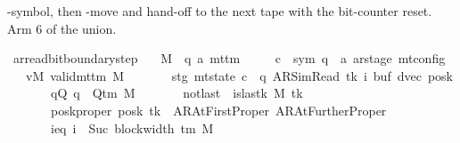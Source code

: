 \begin{isabellebody}
\begin{isamarkuptext}
  -symbol, then -move and hand-off to the next tape
   with the bit-counter reset.  Arm 6 of the union.%
\end{isamarkuptext}\isamarkuptrue%
\isamarkupfalse%
\ ar{\isacharunderscore}{\kern0pt}read{\isacharunderscore}{\kern0pt}bit{\isacharunderscore}{\kern0pt}boundary{\isacharunderscore}{\kern0pt}step{\isacharcolon}{\kern0pt}\isanewline
\ \ \ M\ {\isacharcolon}{\kern0pt}{\isacharcolon}{\kern0pt}\ {\isachardoublequoteopen}{\isacharparenleft}{\kern0pt}{\isacharprime}{\kern0pt}q{\isacharcomma}{\kern0pt}\ {\isacharprime}{\kern0pt}a{\isacharparenright}{\kern0pt}\ mttm{\isachardoublequoteclose}\isanewline
\ \ \ \ \ c{\isacharprime}{\kern0pt}\ {\isacharcolon}{\kern0pt}{\isacharcolon}{\kern0pt}\ {\isachardoublequoteopen}{\isacharparenleft}{\kern0pt}sym{}{\isacharcomma}{\kern0pt}\ {\isacharprime}{\kern0pt}q\ {\isasymtimes}\ {\isacharprime}{\kern0pt}a\ ar{\isacharunderscore}{\kern0pt}stage{\isacharparenright}{\kern0pt}\ mt{\isacharunderscore}{\kern0pt}config{\isachardoublequoteclose}\isanewline
\ \ \ vM{\isacharcolon}{\kern0pt}\ {\isachardoublequoteopen}valid{\isacharunderscore}{\kern0pt}mttm\ M{\isachardoublequoteclose}\isanewline
\ \ \ \ \ \ \ stg{\isacharcolon}{\kern0pt}\ {\isachardoublequoteopen}mt{\isacharunderscore}{\kern0pt}state\ c{\isacharprime}{\kern0pt}\ {\isacharequal}{\kern0pt}\ {\isacharparenleft}{\kern0pt}q{\isacharcomma}{\kern0pt}\ AR{\isacharunderscore}{\kern0pt}SimRead{\isacharcomma}{\kern0pt}\ tk{\isacharcomma}{\kern0pt}\ i{\isacharcomma}{\kern0pt}\ buf{\isacharcomma}{\kern0pt}\ dvec{\isacharcomma}{\kern0pt}\ posk{\isacharparenright}{\kern0pt}{\isachardoublequoteclose}\isanewline
\ \ \ \ \ \ \ qQ{\isacharcolon}{\kern0pt}\ {\isachardoublequoteopen}q\ {\isasymin}\ Q{\isacharunderscore}{\kern0pt}tm\ M{\isachardoublequoteclose}\isanewline
\ \ \ \ \ \ \ notlast{\isacharcolon}{\kern0pt}\ {\isachardoublequoteopen}{\isasymnot}\ is{\isacharunderscore}{\kern0pt}last{\isacharunderscore}{\kern0pt}k\ M\ tk{\isachardoublequoteclose}\isanewline
\ \ \ \ \ \ \ posk{\isacharunderscore}{\kern0pt}proper{\isacharcolon}{\kern0pt}\ {\isachardoublequoteopen}posk\ tk\ {\isasymin}\ {\isacharbraceleft}{\kern0pt}AR{\isacharunderscore}{\kern0pt}AtFirstProper{\isacharcomma}{\kern0pt}\ AR{\isacharunderscore}{\kern0pt}AtFurtherProper{\isacharbraceright}{\kern0pt}{\isachardoublequoteclose}\isanewline
\ \ \ \ \ \ \ ieq{\isacharcolon}{\kern0pt}\ {\isachardoublequoteopen}i\ {\isacharequal}{\kern0pt}\ Suc\ {\isacharparenleft}{\kern0pt}block{\isacharunderscore}{\kern0pt}width\ {\isacharparenleft}{\kern0pt}{\isasymGamma}{\isacharunderscore}{\kern0pt}tm\ M{\isacharparenright}{\kern0pt}{\isacharparenright}{\kern0pt}{\isachardoublequoteclose}\isanewline

\end{isabellebody}
